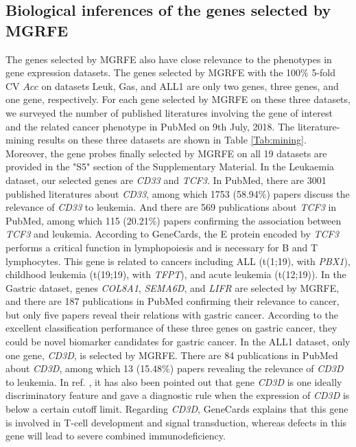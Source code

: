 \documentclass[10pt,journal,compsoc]{IEEEtran}
\begin{document}
	\subsection{Biological inferences of the genes selected by MGRFE}
	
	The genes selected by MGRFE also have close relevance to the phenotypes in gene expression datasets. The genes selected by MGRFE with the 100\% 5-fold CV $Acc$ on datasets Leuk, Gas, and ALL1 are only two genes, three genes, and one gene, respectively.
	For each gene selected by MGRFE on these three datasets, we surveyed the number of published literatures involving the gene of interest and the related cancer phenotype in PubMed on 9th July, 2018. The literature-mining results on these three datasets are shown in Table \ref{Tab:mining}. Moreover, the gene probes finally selected by MGRFE on all 19 datasets are provided in the "S5" section of the Supplementary Material.
	In the Leukaemia dataset, our selected genes are \textit{CD33} and \textit{TCF3}. In PubMed, there are 3001 published literatures about \textit{CD33}, among which 1753 (58.94\%) papers discuss the relevance of \textit{CD33} to leukemia. And there are 569 publications about \textit{TCF3} in PubMed, among which 115 (20.21\%) papers confirming the association between \textit{TCF3} and leukemia. According to GeneCards, the E protein encoded by \textit{TCF3} performs a critical function in lymphopoiesis and is necessary for B and T lymphocytes. This gene is related to cancers including ALL (t(1;19), with \textit{PBX1}), childhood leukemia (t(19;19), with \textit{TFPT}), and acute leukemia (t(12;19)). In the Gastric dataset, genes \textit{COL8A1}, \textit{SEMA6D}, and \textit{LIFR} are selected by MGRFE, and there are 187 publications in PubMed confirming their relevance to cancer, but only five papers reveal their relations with gastric cancer. According to the excellent classification performance of these three genes on gastric cancer, they could be novel biomarker candidates for gastric cancer. In the ALL1 dataset, only one gene, \textit{CD3D}, is selected by MGRFE. There are 84 publications in PubMed about \textit{CD3D}, among which 13 (15.48\%) papers revealing the relevance of \textit{CD3D} to leukemia. In ref. \cite{Y34}, it has also been pointed out that gene \textit{CD3D} is one ideally discriminatory feature and gave a diagnostic rule when the expression of \textit{CD3D} is below a certain cutoff limit. Regarding \textit{CD3D}, GeneCards explains that this gene is involved in T-cell development and signal transduction, whereas defects in this gene will lead to severe combined immunodeficiency.
\end{document}

